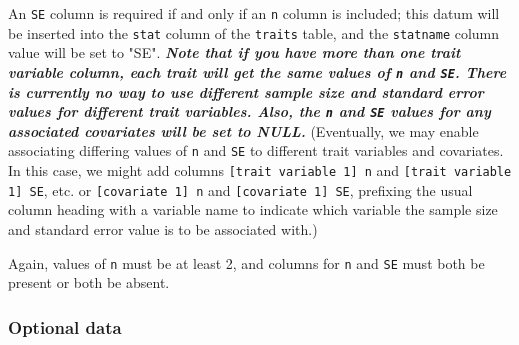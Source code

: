 \begin{enumerate}
An \verb|SE| column is required if and only if an \verb|n| column is included;
    this datum will be inserted into the \verb|stat| column of the \verb|traits| table,
    and the \verb|statname| column value will be set to "SE".  \textit\textbf{Note that if you have more than one trait variable column, each trait will get the same values of \verb|n| and \verb|SE|.  There is currently no way to use different sample size and standard error values for different trait variables.  Also, the \verb|n| and \verb|SE| values for any associated covariates will be set to NULL.}  (Eventually, we may enable associating differing values of \verb|n| and \verb|SE| to different trait variables and covariates.  In this case, we might add columns
 \verb|[trait variable 1] n| and \verb|[trait variable 1] SE|, etc. or
 \verb|[covariate 1] n| and \verb|[covariate 1] SE|, prefixing the usual column heading with a variable name to indicate which variable the sample size and standard error value is to be associated with.)  
 
 Again,
 values of \verb|n| must be at least 2, and columns for \verb|n| and \verb|SE|
 must both be present or both be absent.

  \end{enumerate}

\subsubsection{Optional data}

